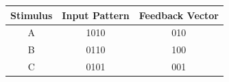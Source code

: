 \documentclass[preview,border=4pt]{standalone}
\begin{document}
\begin{tabular}{ccc}
\toprule
Stimulus & Input Pattern & Feedback Vector \\
\midrule
A & 1010 & 010 \\
B & 0110 & 100 \\
C & 0101 & 001 \\
\bottomrule
\end{tabular}
\end{document}
